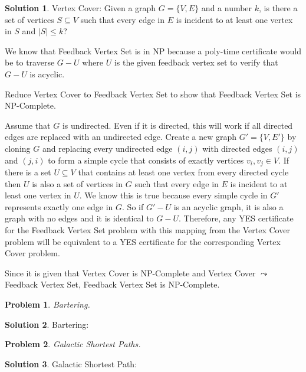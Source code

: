 \documentclass{article}
\newtheorem{problem}{Problem}
\theoremstyle{definition}
\newtheorem*{solution}{Solution}
\begin{document}
\begin{solution}

Vertex Cover: Given a graph \(G=\{V,E\}\) and a number \(k\), is there a set of vertices \(S\subseteq V\) such that every edge in \(E\) is incident to at least one vertex in \(S\) and \(|S|\leq k\)?

We know that Feedback Vertex Set is in NP because a poly-time certificate would be to traverse \(G-U\) where \(U\) is the given feedback vertex set to verify that \(G-U\) is acyclic.

Reduce Vertex Cover to Feedback Vertex Set to show that Feedback Vertex Set is NP-Complete.

Assume that \(G\) is undirected. Even if it is directed, this will work if all directed edges are replaced with an undirected edge. Create a new graph \(G'=\{V,E'\}\) by cloning \(G\) and replacing every undirected edge \((i,j)\) with directed edges \((i,j)\) and \((j,i)\) to form a simple cycle that consists of exactly vertices \(v_i, v_j \in V\). If there is a set \(U\subseteq V\) that contains at least one vertex from every directed cycle then \(U\) is also a set of vertices in \(G\) such that every edge in \(E\) is incident to at least one vertex in \(U\). We know this is true because every simple cycle in \(G'\) represents exactly one edge in \(G\). So if \(G'-U\) is an acyclic graph, it is also a graph with no edges and it is identical to \(G-U\). Therefore, any YES certificate for the Feedback Vertex Set problem with this mapping from the Vertex Cover problem will be equivalent to a YES certificate for the corresponding Vertex Cover problem.

Since it is given that Vertex Cover is NP-Complete and Vertex Cover \(\leadsto \) Feedback Vertex Set, Feedback Vertex Set is NP-Complete.

\end{solution}

\begin{problem}

Bartering.

\end{problem}

\begin{solution}

Bartering: 

\end{solution}

\begin{problem}

Galactic Shortest Paths.

\end{problem}

\begin{solution}

Galactic Shortest Path: 

\end{solution}
\end{document}
